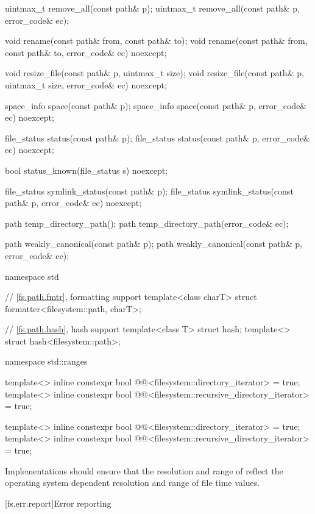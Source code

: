 \begin{codeblock}
{  uintmax_t remove_all(const path& p);
  uintmax_t remove_all(const path& p, error_code& ec);

  void rename(const path& from, const path& to);
  void rename(const path& from, const path& to, error_code& ec) noexcept;

  void resize_file(const path& p, uintmax_t size);
  void resize_file(const path& p, uintmax_t size, error_code& ec) noexcept;

  space_info space(const path& p);
  space_info space(const path& p, error_code& ec) noexcept;

  file_status status(const path& p);
  file_status status(const path& p, error_code& ec) noexcept;

  bool status_known(file_status s) noexcept;

  file_status symlink_status(const path& p);
  file_status symlink_status(const path& p, error_code& ec) noexcept;

  path temp_directory_path();
  path temp_directory_path(error_code& ec);

  path weakly_canonical(const path& p);
  path weakly_canonical(const path& p, error_code& ec);
}

namespace std {
  // \ref{fs.path.fmtr}, formatting support
  template<class charT> struct formatter<filesystem::path, charT>;

  // \ref{fs.path.hash}, hash support
  template<class T> struct hash;
  template<> struct hash<filesystem::path>;
}

namespace std::ranges {
  template<>
    inline constexpr bool @@<filesystem::directory_iterator> = true;
  template<>
    inline constexpr bool @@<filesystem::recursive_directory_iterator> = true;

  template<>
    inline constexpr bool @@<filesystem::directory_iterator> = true;
  template<>
    inline constexpr bool @@<filesystem::recursive_directory_iterator> = true;
}
\end{codeblock}

\pnum
Implementations should ensure that the resolution and range of
 reflect the operating system dependent resolution and range
of file time values.

[fs.err.report]{Error reporting}

